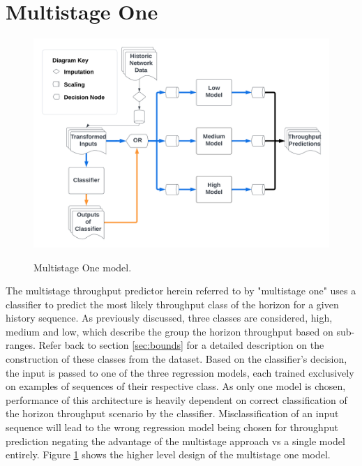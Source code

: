 \newpage
\section{Multistage One}
\begin{figure}[h]
\centering
\includegraphics[scale=0.17]{Multistage One.png}
\label{fig:multistage_one}
\caption{Multistage One model.}
\end{figure}

The multistage throughput predictor herein referred to by "multistage one" uses a classifier to predict the most likely throughput class of the horizon for a given history sequence. As previously discussed, three classes are considered, high, medium and low, which describe the group the horizon throughput based on sub-ranges. Refer back to section \ref{sec:bounds} for a detailed description on the construction of these classes from the dataset. Based on the classifier's decision, the input is passed to one of the three regression models, each trained exclusively on examples of sequences of their respective class. As only one model is chosen, performance of this architecture is heavily dependent on correct classification of the horizon throughput scenario by the classifier. Misclassification of an input sequence will lead to the wrong regression model being chosen for throughput prediction negating the advantage of the multistage approach vs a single model entirely. Figure \ref{fig:multistage_one} shows the higher level design of the multistage one model.

\newpage
